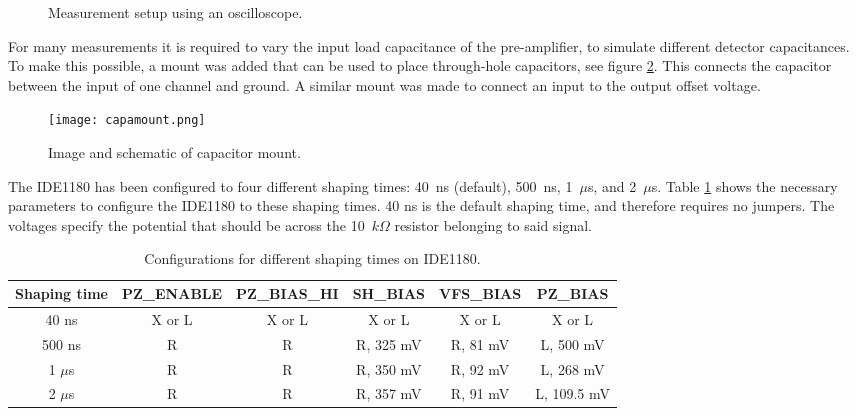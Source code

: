 \documentclass[../main/thesis.tex]{subfiles}
\begin{document}
\begin{figure}
	\centering
	\caption{Measurement setup using an oscilloscope.}
	\label{fig-setup-scope}
\end{figure}

For many measurements it is required to vary the input load capacitance of the pre-amplifier, to simulate different detector capacitances. To make this possible, a mount was added that can be used to place through-hole capacitors, see figure \ref{fig-capmount}. This connects the capacitor between the input of one channel and ground. A similar mount was made to connect an input to the output offset voltage.

\begin{figure}%
	\centering
	\texttt{[image: capamount.png]}
	\caption{Image and schematic of capacitor mount. \citep{Thomas} \citep{IDE1180sch}}
	\label{fig-capmount}
\end{figure} 

The IDE1180 has been configured to four different shaping times: 40~ns (default), 500~ns, 1~$\mu$s, and 2~$\mu$s. Table \ref{tab-ide-shaping} shows the necessary parameters to configure the IDE1180 to these shaping times. 40 ns is the default shaping time, and therefore requires no jumpers. The voltages specify the potential that should be across the 10~$k\Omega$ resistor belonging to said signal.  

\begin{table}[h!]
	\centering
	\caption{Configurations for different shaping times on IDE1180.}
	\label{tab-ide-shaping}
	\begin{tabular}{cccccc}\toprule
		\textbf{Shaping time} & \textbf{PZ\_ENABLE} & \textbf{PZ\_BIAS\_HI} & \textbf{SH\_BIAS}  & \textbf{VFS\_BIAS} & \textbf{PZ\_BIAS}    \\ \midrule
		40 ns        & X or L          & X or L            & X or L        & X or L        & X or L          \\
		500 ns       & R          & R            & R, 325 mV & R, 81 mV  & L, 500 mV   \\
		1 $\mu$s     & R          & R            & R, 350 mV & R, 92 mV  & L, 268 mV   \\
		2 $\mu$s     & R          & R            & R, 357 mV & R, 91 mV  & L, 109.5 mV \\ \bottomrule
	\end{tabular}
\end{table}
\end{document}

